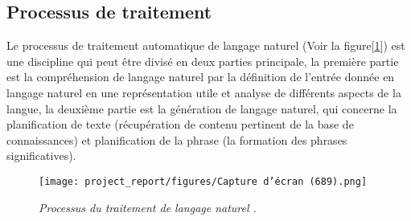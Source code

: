 \subsection{Processus de traitement}
Le processus de traitement automatique de langage naturel (Voir la figure[\ref{fig:figureProcess}]) est une discipline qui peut être divisé en deux parties principale, la première partie est la compréhension de langage naturel par la définition de l’entrée donnée en langage naturel en une représentation utile et analyse de différents aspects de la langue, la deuxième partie est la génération de langage naturel, qui concerne la planification de texte (récupération de contenu pertinent de la base de connaissances) et planification de la phrase (la formation des phrases significatives).
\begin{figure}[h]
    \centering
    \texttt{[image: project\_report/figures/Capture d’écran (689).png]} 
    \caption{\textit{Processus du traitement de langage naturel \cite{technoaretepublication}.}}
        \label{fig:figureProcess}
 
\end{figure}

